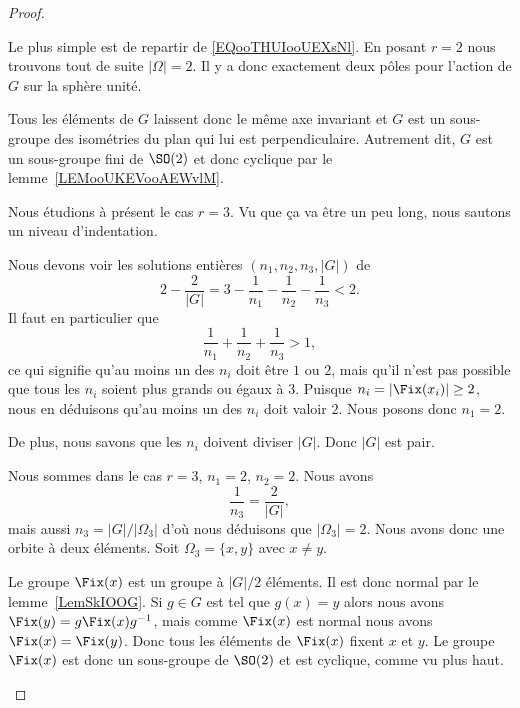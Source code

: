 \begin{proof}
\begin{subproof}
		\spitem[Si \( r=2 \)]
		Le plus simple est de repartir de \eqref{EQooTHUIooUEXsNl}. En posant \( r=2\) nous trouvons tout de suite \( | \Omega |=2\). Il y a donc exactement deux pôles pour l'action de \( G\) sur la sphère unité.

		Tous les éléments de \( G\) laissent donc le même axe invariant et \( G\) est un sous-groupe des isométries du plan qui lui est perpendiculaire. Autrement dit, \( G\) est un sous-groupe fini de \( \SO(2)\) et donc cyclique par le lemme~\ref{LEMooUKEVooAEWvlM}.
	\end{subproof}
	Nous étudions à présent le cas \( r=3\). Vu que ça va être un peu long, nous sautons un niveau d'indentation.
	\begin{subproof}

		\spitem[Les possibilités pour \( r=3 \)]
		Nous devons voir les solutions entières \( (n_1,n_2,n_3,| G |)\) de
		\begin{equation}
			2-\frac{ 2 }{ | G | }=3-\frac{1}{ n_1 }-\frac{1}{ n_2 }-\frac{1}{ n_3 }<2.
		\end{equation}
		Il faut en particulier que
		\begin{equation}
			\frac{1}{ n_1 }+\frac{1}{ n_2 }+\frac{1}{ n_3 }>1,
		\end{equation}
		ce qui signifie qu'au moins un des \( n_i\) doit être \( 1\) ou \( 2\), mais qu'il n'est pas possible que tous les \( n_i\) soient plus grands ou égaux à \( 3\). Puisque \( n_i=| \Fix(x_i) |\geq 2\), nous en déduisons qu'au moins un des \( n_i\) doit valoir \( 2\). Nous posons donc \( n_1=2\).

		De plus, nous savons que les \( n_i\) doivent diviser \( | G |\). Donc \( | G |\) est pair.

		\spitem[Si \( n_2=2 \)]
		Nous sommes dans le cas \( r=3\), \( n_1=2\), \( n_2=2\). Nous avons
		\begin{equation}
			\frac{1}{ n_3 }=\frac{ 2 }{ | G | },
		\end{equation}
		mais aussi \( n_3=| G |/| \Omega_3 |\) d'où nous déduisons que \( | \Omega_3 |=2\). Nous avons donc une orbite à deux éléments. Soit \( \Omega_3=\{ x,y \}\) avec \( x\neq y\).

		Le groupe \( \Fix(x)\) est un groupe à \( | G |/2\) éléments. Il est donc normal par le lemme~\ref{LemSkIOOG}. Si \( g\in G\) est tel que \( g(x)=y\) alors nous avons \( \Fix(y)=g\Fix(x)g^{-1}\), mais comme \( \Fix(x)\) est normal nous avons \( \Fix(x)=\Fix(y)\). Donc tous les éléments de \( \Fix(x)\) fixent \( x\) et \( y\). Le groupe \( \Fix(x)\) est donc un sous-groupe de \( \SO(2)\) et est cyclique, comme vu plus haut.


\end{subproof}
\end{proof}
